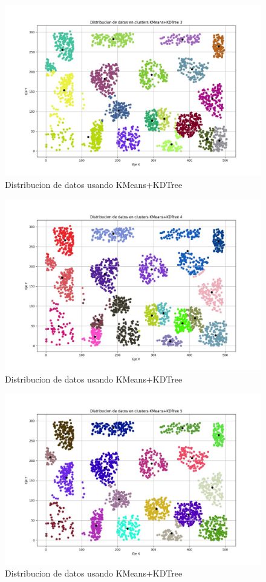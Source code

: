 \documentclass[conference]{IEEEtran}
\begin{document}
\begin{figure}[htbp]
    \centering
    \includegraphics[width=1\linewidth]{figures/kdtree3.jpeg} %
    \caption{Distribucion de datos usando KMeans+KDTree}
    \label{fig:kdtree3}
\end{figure}
\begin{figure}[htbp]
    \centering
    \includegraphics[width=1\linewidth]{figures/kdtree4.jpeg} %
    \caption{Distribucion de datos usando KMeans+KDTree}
    \label{fig:kdtree4}
\end{figure}
\begin{figure}[htbp]
    \centering
    \includegraphics[width=1\linewidth]{figures/kdtree5.jpeg} %
    \caption{Distribucion de datos usando KMeans+KDTree}
    \label{fig:kdtree5}
\end{figure}
\end{document}
